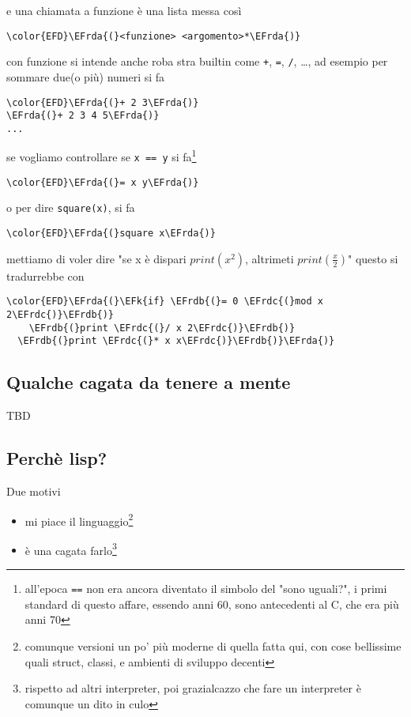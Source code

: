 \documentclass[11pt]{article}
\newcommand{\EFk}[1]{\textcolor{EFk}{#1}} %
\newcommand{\EFrda}[1]{\textcolor{EFrda}{#1}} %
\newcommand{\EFrdb}[1]{\textcolor{EFrdb}{#1}} %
\newcommand{\EFrdc}[1]{\textcolor{EFrdc}{#1}} %
\begin{document}
e una chiamata a funzione è una lista messa così
\begin{Code}
\begin{Verbatim}
\color{EFD}\EFrda{(}<funzione> <argomento>*\EFrda{)}
\end{Verbatim}
\end{Code}
con funzione si intende anche roba stra builtin come \texttt{+}, \texttt{=}, \texttt{/}, \ldots{}, ad esempio per sommare due(o più) numeri si fa
\begin{Code}
\begin{Verbatim}
\color{EFD}\EFrda{(}+ 2 3\EFrda{)}
\EFrda{(}+ 2 3 4 5\EFrda{)}
...
\end{Verbatim}
\end{Code}

se vogliamo controllare se \texttt{x == y} si fa\footnote{all'epoca \texttt{==} non era ancora diventato il simbolo del "sono uguali?", i primi standard di questo affare, essendo anni 60, sono antecedenti al C, che era più anni 70}
\begin{Code}
\begin{Verbatim}
\color{EFD}\EFrda{(}= x y\EFrda{)}
\end{Verbatim}
\end{Code}

o per dire \texttt{square(x)}, si fa
\begin{Code}
\begin{Verbatim}
\color{EFD}\EFrda{(}square x\EFrda{)}
\end{Verbatim}
\end{Code}

mettiamo di voler dire "se x è dispari \(print(x^{2})\), altrimeti \(print(\frac{x}{2})\)"
questo si tradurrebbe con
\begin{Code}
\begin{Verbatim}
\color{EFD}\EFrda{(}\EFk{if} \EFrdb{(}= 0 \EFrdc{(}mod x 2\EFrdc{)}\EFrdb{)}
    \EFrdb{(}print \EFrdc{(}/ x 2\EFrdc{)}\EFrdb{)}
  \EFrdb{(}print \EFrdc{(}* x x\EFrdc{)}\EFrdb{)}\EFrda{)}
\end{Verbatim}
\end{Code}

\subsection{Qualche cagata da tenere a mente}
\label{sec:orgd6ca674}
TBD

\subsection{Perchè lisp?}
\label{sec:orgb4c5200}
Due motivi
\begin{itemize}
\item mi piace il linguaggio\footnote{comunque versioni un po' più moderne di quella fatta qui, con cose bellissime quali struct, classi, e ambienti di sviluppo decenti}
\item è una cagata farlo\footnote{rispetto ad altri interpreter, poi grazialcazzo che fare un interpreter è comunque un dito in culo}
\end{itemize}
\end{document}
